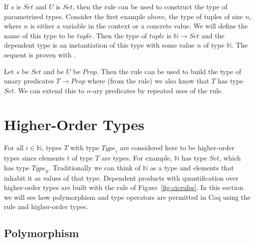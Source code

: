 \begin{expl}

If $s$ is $\mathit{Set}$ and $U$ is $\mathit{Set}$, then the rule  can be used to construct the type of parametrized types. Consider the first example above, the type of tuples of size $n$, where $n$ is either a variable in the context or a concrete value. We will define the name of this type to be $\mathit{tuple}$. Then the type of $\mathit{tuple}$ is $\mathbb{N} \rightarrow \mathit{Set}$ and the dependent type is an instantiation of this type with some value $n$ of type $\mathbb{N}$. The sequent  is proven with .

\end{expl}

\begin{expl}[Predicates]

Let $s$ be $\mathit{Set}$ and be $U$ be $\mathit{Prop}$. Then the rule  can be used to build the type of unary predicates $T \rightarrow \mathit{Prop}$ where (from the rule) we also know that $T$ has type $\mathit{Set}$. We can extend this to $n$-ary predicates by repeated uses of the rule.

\end{expl}

\section{Higher-Order Types}
\label{sec:hot}

For all $i \in \mathbb{N}$, types $T$ with type $\mathit{Type}_i$ are considered here to be higher-order types since elements $t$ of type $T$ are types. For example, $\mathbb{N}$ has type $\mathit{Set}$, which has type $\mathit{Type}_0$. Traditionally we can think of $\mathbb{N}$ as a type and elements that inhabit it as values of that type. Dependent products with quantification over higher-order types are built with the rule  of Figure~\ref{fig:cicrules}. In this section we will see how polymorphism and type operators are permitted in Coq using the  rule and higher-order types.

\subsection{Polymorphism}
\label{subsec:polymorphism}


